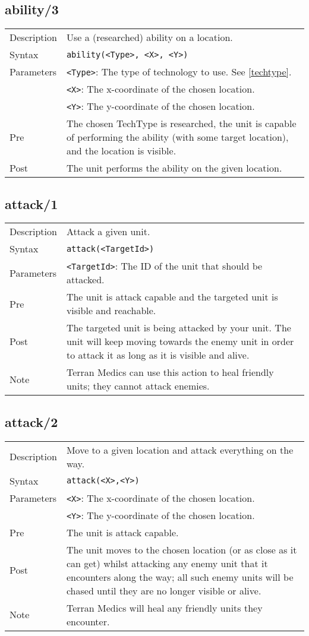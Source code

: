 \subsection{ability/3}
\begin{tabularx}{\textwidth}{lX}
 Description & Use a (researched) ability on a location. \\
 Syntax & \verb|ability(<Type>, <X>, <Y>)| \\
 Parameters & \verb|<Type>|: The type of technology to use. See \ref{techtype}. \\
            & \verb|<X>|: The x-coordinate of the chosen location. \\
            & \verb|<Y>|: The y-coordinate of the chosen location. \\
 Pre & The chosen TechType is researched, the unit is capable of performing the ability (with some target location), and the location is visible. \\
 Post & The unit performs the ability on the given location.
\end{tabularx}

\subsection{attack/1}
\begin{tabularx}{\textwidth}{lX}
 Description & Attack a given unit. \\
 Syntax & \verb|attack(<TargetId>)| \\
 Parameters & \verb|<TargetId>|: The ID of the unit that should be attacked. \\
 Pre & The unit is attack capable and the targeted unit is visible and reachable. \\
 Post & The targeted unit is being attacked by your unit. The unit will keep moving towards the enemy unit in order to attack it as long as it is visible and alive. \\
 Note & Terran Medics can use this action to heal friendly units; they cannot attack enemies.
\end{tabularx}

\subsection{attack/2}
\begin{tabularx}{\textwidth}{lX}
 Description & Move to a given location and attack everything on the way. \\
 Syntax & \verb|attack(<X>,<Y>)| \\
 Parameters & \verb|<X>|: The x-coordinate of the chosen location. \\
            & \verb|<Y>|: The y-coordinate of the chosen location. \\
 Pre & The unit is attack capable. \\
 Post & The unit moves to the chosen location (or as close as it can get) whilst attacking any enemy unit that it encounters along the way; all such enemy units will be chased until they are no longer visible or alive. \\
 Note & Terran Medics will heal any friendly units they encounter.
\end{tabularx}

